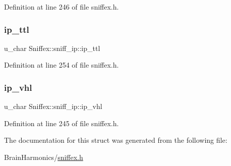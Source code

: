Definition at line 246 of file sniffex.\+h.

\mbox{\label{struct_sniffex_1_1sniff__ip_aea2468d9918eb811586acb71de6870ef}} 
\subsubsection{\texorpdfstring{ip\+\_\+ttl}{ip\_ttl}}
{\footnotesize\ttfamily u\+\_\+char Sniffex\+::sniff\+\_\+ip\+::ip\+\_\+ttl}



Definition at line 254 of file sniffex.\+h.

\mbox{\label{struct_sniffex_1_1sniff__ip_a64daddec106d5178ffbfe2f07378e438}} 
\subsubsection{\texorpdfstring{ip\+\_\+vhl}{ip\_vhl}}
{\footnotesize\ttfamily u\+\_\+char Sniffex\+::sniff\+\_\+ip\+::ip\+\_\+vhl}



Definition at line 245 of file sniffex.\+h.



The documentation for this struct was generated from the following file\+:\begin{DoxyCompactItemize}
\item 
Brain\+Harmonics/\mbox{\hyperlink{sniffex_8h}{sniffex.\+h}}\end{DoxyCompactItemize}
